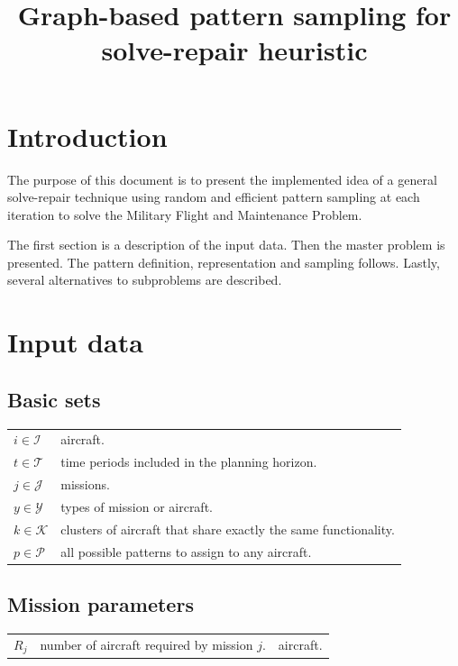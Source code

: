 \documentclass[a4paper,11pt]{article}
\title{Graph-based pattern sampling for solve-repair heuristic}
\author{}
\begin{document}
\maketitle

\section{Introduction}
  \label{sec:model}

  The purpose of this document is to present the implemented idea of a general solve-repair technique using random and efficient pattern sampling at each iteration to solve the Military Flight and Maintenance Problem.

  The first section is a description of the input data. Then the master problem is presented. The pattern definition, representation and sampling follows. Lastly, several alternatives to subproblems are described.

\section{Input data}
    \subsection{Basic sets}

        \begin{tabular}{p{15mm}p{140mm}}
            $i \in \mathcal{I}$     &  aircraft. \\
            $t \in \mathcal{T}$     &  time periods included in the planning horizon. \\
            $j \in \mathcal{J}$     &  missions. \\
            $y \in \mathcal{Y}$     &  types of mission or aircraft. \\
            $k \in \mathcal{K}$     &  clusters of aircraft that share exactly the same functionality. \\
            $p \in \mathcal{P}$     &  all possible patterns to assign to any aircraft. \\
        \end{tabular}

    \subsection{Mission parameters}

        \begin{tabular}{p{15mm}p{125mm}p{15mm}}
            $R_j$             & number of aircraft required by mission $j$. & aircraft. \\
        \end{tabular}
\end{document}

